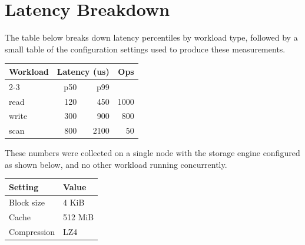 \documentclass[11pt,letterpaper]{article}
\begin{document}
\onecolumn
\newpage

\section*{Latency Breakdown}

The table below breaks down latency percentiles by workload type, followed by a small table of the configuration settings used to produce these measurements.

\begin{center}
\begin{tabular}{l r r r}
\toprule
Workload & \multicolumn{2}{c}{Latency (us)} & Ops \\
\cmidrule(lr){2-3}
 & p50 & p99 & \\
\midrule
read  & 120 & 450  & 1000 \\
write & 300 & 900  & 800  \\
scan  & 800 & 2100 & 50   \\
\bottomrule
\end{tabular}
\end{center}

These numbers were collected on a single node with the storage engine configured as shown below, and no other workload running concurrently.

\begin{center}
\begin{tabular}{l l}
\toprule
Setting & Value \\
\midrule
Block size   & 4 KiB   \\
Cache        & 512 MiB \\
Compression  & LZ4     \\
\bottomrule
\end{tabular}
\end{center}
\end{document}
